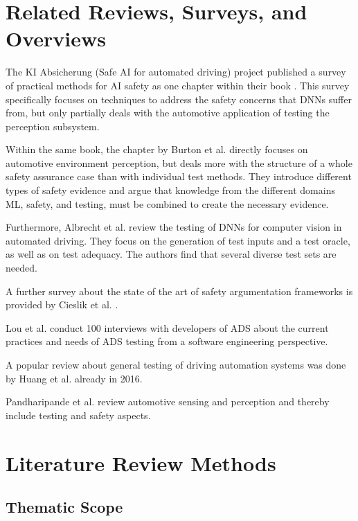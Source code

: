 \documentclass[conference]{IEEEtran}
\begin{document}
\section{Related Reviews, Surveys, and Overviews}
\label{sec:related_work}

The KI Absicherung (Safe AI for automated driving) project published a survey of practical methods for AI safety as one chapter within their book \cite{Houben2022inspect}.
This survey specifically focuses on techniques to address the safety concerns that DNNs suffer from, but only partially deals with the automotive application of testing the perception subsystem. 

Within the same book, the chapter by Burton et al. \cite{Burton2022safety} directly focuses on automotive environment perception, but deals more with the structure of a whole safety assurance case than with individual test methods. 
They introduce different types of safety evidence and argue that knowledge from the different domains ML, safety, and testing, must be combined to create the necessary evidence. 

Furthermore, Albrecht et al. \cite{Abrecht2021testing} review the testing of DNNs for computer vision in automated driving. 
They focus on the generation of test inputs and a test oracle, as well as on test adequacy. 
The authors find that several diverse test sets are needed. 

A further survey about the state of the art of safety argumentation frameworks is provided by Cieslik et al. \cite{Cieslik2022argumentation}.

Lou et al. \cite{Lou2022testing} conduct 100 interviews with developers of ADS about the current practices and needs of ADS testing from a software engineering perspective. 

A popular review about general testing of driving automation systems was done by Huang et al. \cite{Huang2016review} already in 2016.

Pandharipande et al. \cite{Pandharipande2023review} review automotive sensing and perception and thereby include testing and safety aspects.

\section{Literature Review Methods}
\label{sec:methods}


\subsection{Thematic Scope}
\end{document}
